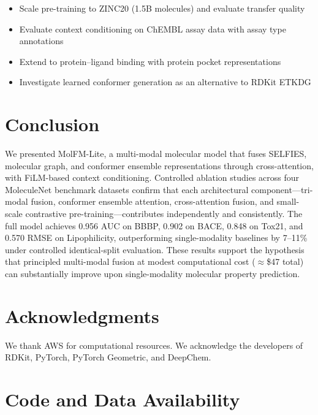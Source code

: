 \documentclass[11pt]{article}
\newcommand{\modelname}{MolFM-Lite}
\begin{document}
\begin{itemize}[leftmargin=*,itemsep=2pt]
    \item Scale pre-training to ZINC20 (1.5B molecules) and evaluate transfer quality
    \item Evaluate context conditioning on ChEMBL assay data with assay type annotations
    \item Extend to protein--ligand binding with protein pocket representations
    \item Investigate learned conformer generation as an alternative to RDKit ETKDG
\end{itemize}

\section{Conclusion}
\label{sec:conclusion}

We presented \modelname{}, a multi-modal molecular model that fuses SELFIES, molecular graph, and conformer ensemble representations through cross-attention, with FiLM-based context conditioning. Controlled ablation studies across four MoleculeNet benchmark datasets confirm that each architectural component---tri-modal fusion, conformer ensemble attention, cross-attention fusion, and small-scale contrastive pre-training---contributes independently and consistently. The full model achieves 0.956 AUC on BBBP, 0.902 on BACE, 0.848 on Tox21, and 0.570 RMSE on Lipophilicity, outperforming single-modality baselines by 7--11\% under controlled identical-split evaluation. These results support the hypothesis that principled multi-modal fusion at modest computational cost ($\approx$\$47 total) can substantially improve upon single-modality molecular property prediction.

\section*{Acknowledgments}

We thank AWS for computational resources. We acknowledge the developers of RDKit, PyTorch, PyTorch Geometric, and DeepChem.

\section*{Code and Data Availability}
\end{document}
